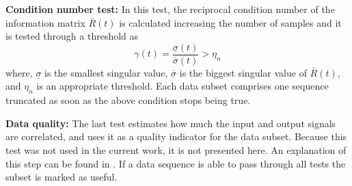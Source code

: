 \textbf{Condition number test:} In this test, the reciprocal condition number of the information matrix $\bar{R}(t)$ is calculated increasing the number of samples and it is tested through a threshold as
\begin{equation}
	\gamma(t) = \frac{\underline{\sigma}(t)}{\overline{\sigma}(t)} > \eta_n
\label{eq:cond_number}
\end{equation}
where, $\underline{\sigma}$ is the smallest singular value, $\overline{\sigma}$ is the biggest singular value of $\bar{R}(t)$, and $\eta_n$ is an appropriate threshold.
Each data subset comprises one sequence truncated as soon as the above condition stops being true.

\textbf{Data quality: } The last test estimates how much the input and output signals are correlated, and uses it as a quality indicator for the data subset.
Because this test was not used in the current work, it is not presented here.
An explanation of this step can be found in \cite{bittencourt2015algorithm}.
If a data sequence is able to pass through all tests the subset is marked as useful.

%
%
%
%
%


